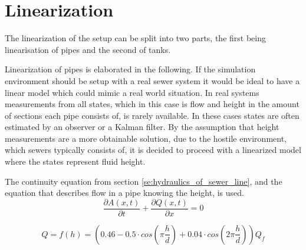 \section{Linearization}\label{se:linearization}
The linearization of the setup can be split into two parts, the first being linearisation of pipes and the second of tanks. 

Linearization of pipes is elaborated in the following.
If the simulation environment should be setup with a real sewer system it would be ideal to have a linear model which could mimic a real world situation.
In real systems measurements from all states, which in this case is flow and height in the amount of sections each pipe consists of, is rarely available.
In these cases states are often estimated by an observer or a Kalman filter. By the assumption that height measurements are a more obtainable solution, due to the hostile environment, which sewers typically consists of, it is decided to proceed with a linearized model where the states represent fluid height.

The continuity equation from section \ref{se:hydraulics_of_sewer_line}, and the equation that describes flow in a pipe knowing the height, is used. 
\begin{equation}\label{eq:linearization_Continuity}
\frac{\partial A(x,t)}{\partial t} + \frac{\partial Q(x,t)}{\partial x}=0
\end{equation}

\begin{equation}\label{eq:flow_eq_given_a_height}
	Q = f(h) = \left(0.46-0.5 \cdot cos\left(\pi \frac{h}{d}\right)+0.04\cdot cos\left(2\pi\frac{h}{d}\right)\right)Q_f
\end{equation}



